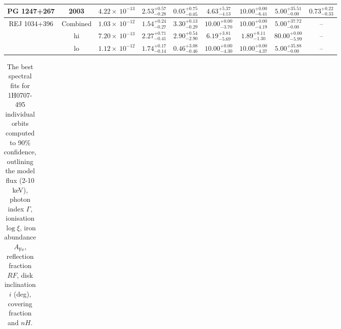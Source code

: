 \documentclass{article}
\begin{document}
\begin{landscape}
\begin{longtable}{ccccccccc}
PG 1247+267 & 2003 & $4.22 \times~10^{-13}$ & $2.53^{+0.57}_{-0.28}$ & $0.05^{+0.75}_{-0.05}$ & $4.63^{+5.37}_{-4.13}$ & $10.00^{+0.00}_{-6.41}$ & $5.00^{+35.51}_{-0.00}$ & $0.73^{+0.22}_{-0.33}$ \\ \hline 

REJ 1034+396 & Combined & $1.03 \times~10^{-12}$ & $1.54^{+0.24}_{-0.27}$ & $3.30^{+0.13}_{-0.29}$ & $10.00^{+0.00}_{-3.70}$ & $10.00^{+0.00}_{-4.19}$ & $5.00^{+37.72}_{-0.00}$ & -- \\ 
& hi & $7.20 \times~10^{-13}$ & $2.27^{+0.71}_{-0.41}$ & $2.90^{+0.54}_{-2.90}$ & $6.19^{+3.81}_{-5.69}$ & $1.89^{+8.11}_{-1.30}$ & $80.00^{+0.00}_{-5.99}$ & -- \\ 
& lo & $1.12 \times~10^{-12}$ & $1.74^{+0.17}_{-0.14}$ & $0.46^{+3.08}_{-0.46}$ & $10.00^{+0.00}_{-4.30}$ & $10.00^{+0.00}_{-4.37}$ & $5.00^{+35.88}_{-0.00}$ & -- \\ \hline 
\end{longtable}

\begin{longtable}{cccccccccl}
\caption[1H0707-495 individual orbits Relxill spectral fits]{The best spectral fits for 1H0707-495 individual orbits computed to 90\% confidence, outlining the model flux (2-10 keV), photon index $\Gamma$, ionisation $\log\xi$, iron abundance $A_\text{Fe}$, reflection fraction $RF$, disk inclination $i$ (deg), covering fraction and $nH$.}\\


\end{longtable}
\end{landscape}
\end{document}
